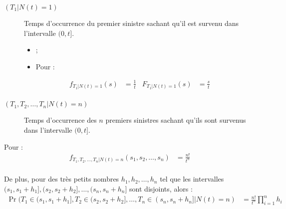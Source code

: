 \documentclass[10pt, french]{article}
\begin{document}
\begin{multicols*}{2}
\begin{description}
	\item[$(T_{1} | N(t)	=	1)$]	Temps d'occurrence du premier sinistre sachant qu'il est survenu dans l'intervalle $(0, t]$.
		\begin{itemize}
		\item	{} ;
		\item	Pour  :
		\end{itemize}
		\begin{align*}
		f_{T_{1} | N(t)	=	1}(s)	
		&=	\frac{1}{t}	&
		F_{T_{1} | N(t)	=	1}(s)	
		&=	\frac{s}{t}	\\
		\end{align*}
\end{description}


\begin{description}
	\item[$(T_{1}, T_{2}, \dots, T_{n} | N(t)	=	n)$]	Temps d'occurrence des $n$ premiers sinistres sachant qu'ils sont survenus dans l'intervalle $(0, t]$.
\end{description}

Pour  :
\begin{align*}
	f_{T_{1}, T_{2}, \dots, T_{n} | N(t)	=	n}(s_{1}, s_{2}, \dots, s_{n})	
	&=	\frac{n!}{t^{n}}	\\
\end{align*}

De plus, pour des très petits nombres $h_{1}, h_{2}, \dots, h_{n}$ tel que les intervalles $(s_{1}, s_{1} + h_{1}], (s_{2}, s_{2} + h_{2}], \dots, (s_{n}, s_{n} + h_{n}]$ sont disjoints, alors :
\begin{align*}
	\Pr(T_{1} \in (s_{1}, s_{1} + h_{1}], T_{2} \in (s_{2}, s_{2} + h_{2}], \dots, T_{n} \in (s_{n}, s_{n} + h_{n}] | N(t)	=	n)
	&=	\frac{n!}{t^{n}}	 \prod_{i = 1}^{n}h_{i}\\
\end{align*}




\end{multicols*}
\end{document}
